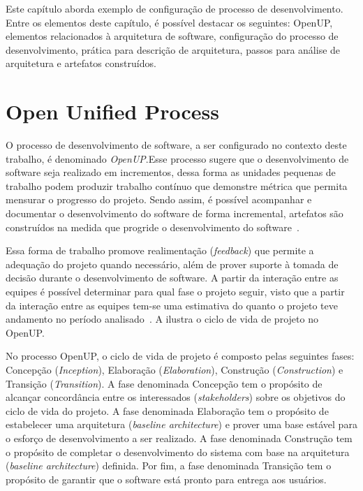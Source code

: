 Este capítulo aborda exemplo de configuração de processo de desenvolvimento. Entre os elementos deste capítulo, é possível destacar os seguintes: \acrfull{OpenUP}, elementos relacionados à arquitetura de software, configuração do processo de desenvolvimento, prática para descrição de arquitetura, passos para análise de arquitetura e artefatos construídos.

\section{Open Unified Process}

O processo de desenvolvimento de software, a ser configurado no contexto deste trabalho, é denominado \emph{\acrfull{OpenUP}}.Esse processo sugere que o desenvolvimento de software seja realizado em incrementos, dessa forma as unidades pequenas de trabalho podem produzir trabalho contínuo que demonstre métrica que permita mensurar o progresso do projeto. Sendo assim, é possível acompanhar e documentar o desenvolvimento do software de forma incremental, artefatos são construídos na medida que progride o desenvolvimento do software~\cite{openup}. 

Essa forma de trabalho promove realimentação (\emph{feedback}) que permite a adequação do projeto quando necessário, além de prover suporte à tomada de decisão durante o desenvolvimento de software. A partir da interação entre as equipes é possível determinar para qual fase o projeto seguir, visto que a partir da interação entre as equipes tem-se uma estimativa do quanto o projeto teve andamento no período analisado~\cite{openup}. A  ilustra o ciclo de vida de projeto no OpenUP.

%

No processo OpenUP, o ciclo de vida de projeto é composto pelas seguintes fases: Concepção (\emph{Inception}), Elaboração (\emph{Elaboration}), Construção (\emph{Construction}) e Transição (\emph{Transition}). A fase denominada  Concepção tem o propósito de alcançar concordância entre os interessados (\emph{stakeholders}) sobre os objetivos do ciclo de vida do projeto. A fase denominada Elaboração tem o propósito de estabelecer uma arquitetura (\emph{baseline architecture}) e prover uma base estável para o esforço de desenvolvimento a ser realizado. A fase denominada Construção tem o propósito de completar o desenvolvimento do sistema com base na arquitetura (\emph{baseline architecture}) definida. Por fim, a fase denominada Transição tem o propósito de garantir que o software está pronto para entrega aos usuários.

